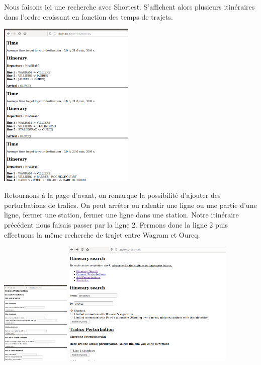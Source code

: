 \documentclass[french, 12pt]{article}
\begin{document}
Nous faisons ici une recherche avec Shortest. S'affichent alors plusieurs itinéraires dans l'ordre croissant en fonction des temps de trajets.

\includegraphics[height=8cm]{images/resultwithoutperturb.png}

Retournons à la page d'avant, on remarque la possibilité d'ajouter des perturbations de trafics. On peut arrêter ou ralentir une ligne ou une partie d'une ligne, fermer une station, fermer une ligne dans une station. Notre itinéraire précédent nous faisais passer par la ligne 2. Fermons donc la ligne 2 puis effectuons la même recherche de trajet entre Wagram et Ourcq.

\includegraphics[height=4cm]{images/addpert.png}
\includegraphics[height=6cm]{images/itiwithpert.png}
\end{document}
